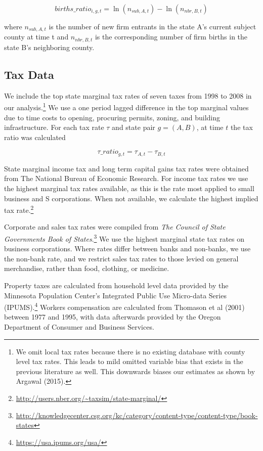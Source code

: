 \documentclass[12pt,a4paper]{article}
\begin{document}
\begin{equation} births\_ratio_{i,g,t} = \ln(n_{sub,A,t})-\ln(n_{nbr,B,t})\end{equation}

where $n_{sub,A,t}$ is the number of new firm entrants in the state A's current subject county at time t and  $n_{nbr,B,t}$ is the corresponding number of firm births in the state B's neighboring county.

\subsection{Tax Data}

We include the top state marginal tax rates of seven taxes from 1998 to 2008 in our analysis.\footnote{We omit local tax rates because there is no existing database with county level tax rates. This leads to mild omitted variable bias that exists in the previous literature as well. This downwards biases our estimates as shown by Argawal (2015).} We use a one period lagged difference in the top marginal values due to time costs to opening, procuring permits, zoning, and building infrastructure. For each tax rate $\tau$ and state pair $g = (A,B)$, at time $t$ the tax ratio was calculated 

\begin{equation} \tau\_ratio_{g,t} = \tau_{A,t}-\tau_{B,t} \end{equation}

State marginal income tax and long term capital gains tax rates were obtained from The National Bureau of Economic Research. For income tax rates we use the highest marginal tax rates available, as this is the rate most applied to small business and S corporations. When not available, we calculate the highest implied tax rate.\footnote{\url{http://users.nber.org/~taxsim/state-marginal/}}

Corporate and sales tax rates were compiled from \textit{The Council of State Governments Book of States}.\footnote{\url{http://knowledgecenter.csg.org/kc/category/content-type/content-type/book-states}} We use the highest marginal state tax rates on business corporations. Where rates differ between banks and non-banks, we use the non-bank rate, and we restrict sales tax rates to those levied on general merchandise, rather than food, clothing, or medicine.

Property taxes are calculated from household level data provided by the Minnesota Population Center’s Integrated Public Use Micro-data Series (IPUMS).\footnote{\url{https://usa.ipums.org/usa/}} Workers compensation are calculated from Thomason et al (2001) between 1977 and 1995, with data afterwards provided by the Oregon Department of Consumer and Business Services. 
\end{document}
